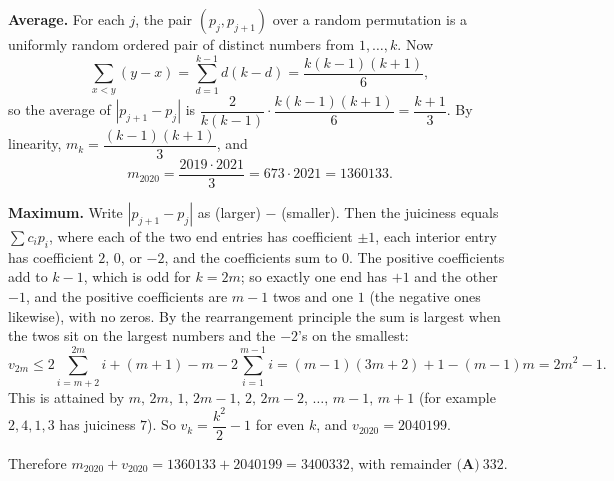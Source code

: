 \textbf{Average.} For each $j$, the pair $(p_j,p_{j+1})$ over a random permutation is a uniformly random ordered pair of distinct numbers from $1,\dots,k$. Now
\[\sum_{x<y}(y-x)=\sum_{d=1}^{k-1}d(k-d)=\dfrac{k(k-1)(k+1)}{6},\]
so the average of $|p_{j+1}-p_j|$ is $\dfrac{2}{k(k-1)}\cdot\dfrac{k(k-1)(k+1)}{6}=\dfrac{k+1}{3}$. By linearity, $m_k=\dfrac{(k-1)(k+1)}{3}$, and
\[m_{2020}=\dfrac{2019\cdot2021}{3}=673\cdot2021=1360133 .\]

\textbf{Maximum.} Write $|p_{j+1}-p_j|$ as (larger) $-$ (smaller). Then the juiciness equals $\sum c_ip_i$, where each of the two end entries has coefficient $\pm1$, each interior entry has coefficient $2$, $0$, or $-2$, and the coefficients sum to $0$. The positive coefficients add to $k-1$, which is odd for $k=2m$; so exactly one end has $+1$ and the other $-1$, and the positive coefficients are $m-1$ twos and one $1$ (the negative ones likewise), with no zeros. By the rearrangement principle the sum is largest when the twos sit on the largest numbers and the $-2$'s on the smallest:
\[v_{2m}\le2\sum_{i=m+2}^{2m}i+(m+1)-m-2\sum_{i=1}^{m-1}i=(m-1)(3m+2)+1-(m-1)m=2m^2-1 .\]
This is attained by $m,\,2m,\,1,\,2m-1,\,2,\,2m-2,\,\dots,\,m-1,\,m+1$ (for example $2,4,1,3$ has juiciness $7$). So $v_k=\dfrac{k^2}{2}-1$ for even $k$, and $v_{2020}=2040199$.

Therefore $m_{2020}+v_{2020}=1360133+2040199=3400332$, with remainder $\boxed{\textbf{(A)}\ 332}$.

